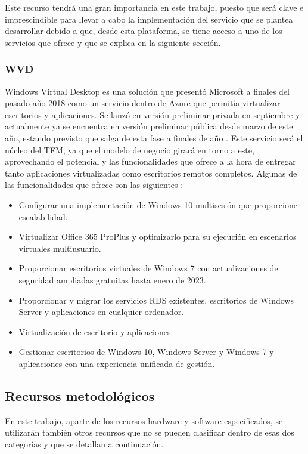 Este recurso tendrá una gran importancia en este trabajo, puesto que será clave e imprescindible para llevar a cabo la implementación del servicio que se plantea desarrollar debido a que, desde esta plataforma, se tiene acceso a uno de los servicios que ofrece y que se explica en la siguiente sección.

\subsubsection{\acf{WVD}}
Windows Virtual Desktop es una solución que presentó Microsoft a finales del pasado año 2018 como un servicio dentro de Azure que permitía virtualizar escritorios y aplicaciones. Se lanzó en versión preliminar privada en septiembre y actualmente ya se encuentra en versión preliminar pública desde marzo de este año, estando previsto que salga de esta fase a finales de año \cite{juliawhitebradanderson2019}. Este servicio será el núcleo del \acs{TFM}, ya que el modelo de negocio girará en torno a este, aprovechando el potencial y las funcionalidades que ofrece a la hora de entregar tanto aplicaciones virtualizadas como escritorios remotos completos. Algunas de las funcionalidades que ofrece son las siguientes \cite{microsoftwvd2019}:

\begin{itemize}
    \item Configurar una implementación de Windows 10 multisesión que proporcione escalabilidad.
    \item Virtualizar Office 365 ProPlus y optimizarlo para su ejecución en \mbox{escenarios} virtuales multiusuario.
    \item Proporcionar escritorios virtuales de Windows 7 con actualizaciones de seguridad ampliadas gratuitas hasta enero de 2023.
    
    \clearpage
    
    \item Proporcionar y migrar los servicios \acf{RDS} existentes, escritorios de Windows Server y aplicaciones en cualquier ordenador.
    \item Virtualización de escritorio y aplicaciones.
    \item Gestionar escritorios de Windows 10, Windows Server y Windows 7 y aplicaciones con una experiencia unificada de gestión.
\end{itemize}

\subsection{Recursos metodológicos}
En este trabajo, aparte de los recursos hardware y software especificados, se utilizarán también otros recursos que no se pueden clasificar dentro de esas dos categorías y que se detallan a continuación.

